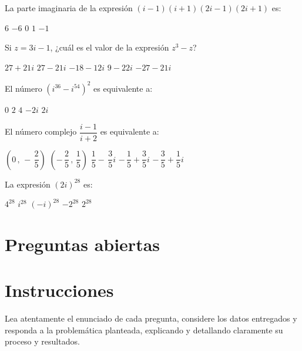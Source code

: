 \documentclass[]{srs}
\begin{document}
\begin{preguntas}[after-item-skip=2cm]
\pregunta La parte imaginaria de la expresión
$(i-1)(i+1)(2i-1)(2i+1)$ es:\\
\begin{vertical}
\alternativa $6$
\alternativa $-6$
\alternativa $0$
\alternativa $1$
\alternativa $-1$
\end{vertical}

\pregunta Si $z=3i-1$, ¿cuál es el valor de la
expresión $z^3-z$?\\
\begin{vertical}
  \alternativa $27+21i$
  \alternativa $27-21i$
  \alternativa $-18-12i$
  \alternativa $9-22i$
  \alternativa $-27-21i$
\end{vertical}


\pregunta El número $(i^{36}-i^{54})^2$ es equivalente a:\\
\begin{vertical}
  \alternativa $0$
  \alternativa $2$
  \alternativa $4$
  \alternativa $-2i$
  \alternativa $2i$
\end{vertical}

\pregunta El número complejo $\dfrac{i-1}{i+2}$ es equivalente a:\\
\begin{vertical}
  \alternativa $\left(0\,,\,-\,\dfrac{2}{5}\right)$
  \alternativa $\left(-\,\dfrac{2}{5}\,,\,\dfrac{1}{5}\right)$
  \alternativa $\dfrac{1}{5}-\,\dfrac{3}{5}i$
  \alternativa $-\,\dfrac{1}{5}+\dfrac{3}{5}i$
  \alternativa $-\,\dfrac{3}{5}+\dfrac{1}{5}i$
\end{vertical}

\pregunta La expresión $(2i)^{28}$ es:\\
\begin{vertical}
  \alternativa $4^{28}$
  \alternativa $i^{28}$
  \alternativa $(-i)^{28}$
  \alternativa $-2^{28}$
  \alternativa $2^{28}$
\end{vertical}

\end{preguntas}

\section{Preguntas abiertas}

\section*{Instrucciones}
Lea atentamente el enunciado de cada pregunta, considere los datos entregados y
responda a la problemática planteada, explicando y detallando claramente
su proceso y resultados.
\end{document}
